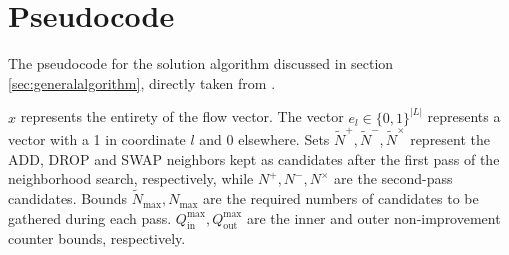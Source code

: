 \chapter{Pseudocode} \label{app:pseudocode}
The pseudocode for the solution algorithm discussed in section \ref{sec:generalalgorithm}, directly taken from \cite{rumpf}.

$x$ represents the entirety of the flow vector. The vector $e_l \in \{0,1\}^{|L|}$ represents a vector with a 1 in coordinate $l$ and 0 elsewhere. Sets $\tilde N^+, \tilde N^-, \tilde N^\times$ represent the ADD, DROP and SWAP neighbors kept as candidates after the first pass of the neighborhood search, respectively, while $N^+, N^-, N^\times$ are the second-pass candidates. Bounds $\tilde N_{\text{max}}, N_{\text{max}}$ are the required numbers of candidates to be gathered during each pass. $Q^{\text{max}}_{\text{in}}, Q^{\text{max}}_{\text{out}}$ are the inner and outer non-improvement counter bounds, respectively.

